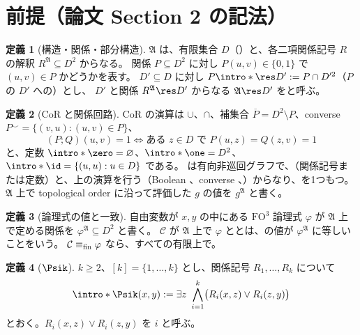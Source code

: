 \documentclass[11pt,a4paper]{ltjsarticle}
\newcommand{\A}{\mathfrak A}
\newcommand{\Comp}{\mathcal C}
\newcommand{\FOthree}{\mathrm{FO}^3}
\theoremstyle{definition}
\newtheorem{definition}{定義}
\begin{document}
\section{前提（論文 Section 2 の記法）}
\begin{definition}[構造・関係・部分構造]
\AP{} $\A$ は、有限集合 $D$（）と、各二項関係記号 $R$ の解釈 $R^{\A}\subseteq D^2$ からなる。
関係 $P\subseteq D^2$ に対し $P(u,v)\in\{0,1\}$ で $(u,v)\in P$ かどうかを表す。
$D'\subseteq D$ に対し $P\intro*\res D':=P\cap D'^2$（$P$ の $D'$ への）とし、 $D'$ と関係 $R^{\A}\res D'$ からなる $\A\res D'$ を\AP{}と呼ぶ。
\end{definition}

\begin{definition}[CoR と関係回路]
CoR の演算は $\cup$、$\cap$、補集合 $\overline P=D^2\setminus P$、converse $P^\smile=\{(v,u):(u,v)\in P\}$、
\[
 (P;Q)(u,v)=1\iff\text{ある }z\in D\text{ で }P(u,z)=Q(z,v)=1
\]
と、定数 $\intro*\zero=\varnothing$、$\intro*\one=D^2$、$\intro*\id=\{(u,u):u\in D\}$ である。
\AP{}は有向非巡回グラフで、\AP{}（関係記号または定数）と、上の演算を行う（Boolean 、converse 、\AP{}）からなり、を1つもつ。
 $\A$ 上で topological order に沿って評価した $g$ の値を $g^{\A}$ と書く。
\end{definition}

\begin{definition}[論理式の値と一致]
自由変数が $x,y$ の中にある $\FOthree$ 論理式 $\varphi$ が $\A$ 上で定める関係を $\varphi^{\A}\subseteq D^2$ と書く。
 $\Comp$ が $\A$ 上で $\varphi$ と\AP{}とは、の値が $\varphi^{\A}$ に等しいことをいう。
$\Comp\equiv_{\rm fin}\varphi$ なら、すべての有限上で。
\end{definition}

\begin{definition}[$\Psik$]
$k\ge2$、$[k]=\{1,\dots,k\}$ とし、関係記号 $R_1,\dots,R_k$ について
\[
 \intro*\Psik(x,y):=\exists z\ \bigwedge_{i=1}^k\bigl(R_i(x,z)\lor R_i(z,y)\bigr)
\]
とおく。$R_i(x,z)\lor R_i(z,y)$ を\AP{} $i$ と呼ぶ。
\end{definition}
\end{document}
